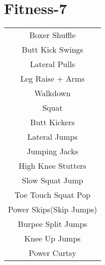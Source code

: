 \documentclass[12pt]{article}
\newcommand\myPadding{1.5}
\begin{document}
\section{Fitness-7}



\begin{center}
  \bgroup
  \def\arraystretch{\myPadding}%
  \begin{tabular}{ c  }
Boxer Shuffle
\\
Butt Kick Swings
\\
Lateral Pulls
\\
Leg Raise + Arms
\\
Walkdown
\\
Squat
\\
Butt Kickers
\\
Lateral Jumps
\\
Jumping Jacks
\\
High Knee Stutters
\\
Slow Squat Jump
\\
Toe Touch Squat Pop
\\
Power Skips(Skip Jumps)
\\
Burpee Split Jumps
\\
Knee Up Jumps
\\
Power Curtsy
  \end{tabular}
  \egroup
\end{center}
\end{document}
